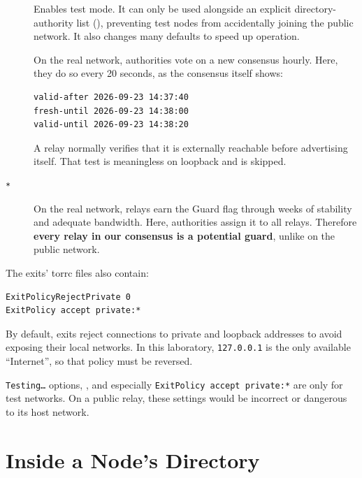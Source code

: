 \begin{description}
  \item[] Enables test mode. It can only be used alongside an explicit directory-authority list (), preventing test nodes from accidentally joining the public network. It also changes many defaults to speed up operation.
  \item[] On the real network, authorities vote on a new consensus hourly. Here, they do so every 20 seconds, as the consensus itself shows:
\begin{lstlisting}[numbers=none]
valid-after 2026-09-23 14:37:40
fresh-until 2026-09-23 14:38:00
valid-until 2026-09-23 14:38:20
\end{lstlisting}
  \item[] A relay normally verifies that it is externally reachable before advertising itself. That test is meaningless on loopback and is skipped.
  \item[ \texttt{*}] On the real network, relays earn the Guard flag through weeks of stability and adequate bandwidth. Here, authorities assign it to all relays. Therefore \textbf{every relay in our consensus is a potential guard}, unlike on the public network.
\end{description}

The exits' torrc files also contain:
\begin{lstlisting}[language=torrc,numbers=none]
ExitPolicyRejectPrivate 0
ExitPolicy accept private:*
\end{lstlisting}
By default, exits reject connections to private and loopback addresses to avoid exposing their local networks. In this laboratory, \texttt{127.0.0.1} is the only available \enquote{Internet}, so that policy must be reversed.

\begin{attenzione}
\texttt{Testing\ldots} options, , and especially \texttt{ExitPolicy accept private:*} are only for test networks. On a public relay, these settings would be incorrect or dangerous to its host network.
\end{attenzione}

\section{Inside a Node's Directory}\label{sec:rp-file}

